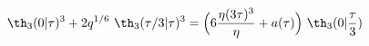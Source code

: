 \begin{equation}
  \th_3(0|\tau)^3 +2 q^{1/6}~\th_3(\tau/3|\tau)^3 = \Big( 6{\eta
    (3\tau)^3 \over\eta} +a(\tau)\Big)~\th_3(0|{\tau\over 3})
\end{equation}

